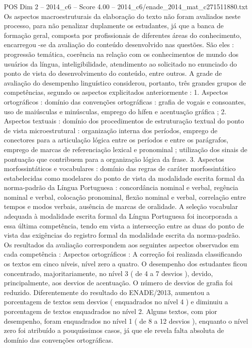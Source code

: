 \begin{textsample}{POS Dim 2 – 2014\_c6 – Score 4.00 – 2014\_c6/enade\_2014\_mat\_c271511880.txt}
Os aspectos macroestruturais da elaboração do texto não foram avaliados neste processo, para não penalizar duplamente os estudantes, já que a banca de formação geral, composta por profissionais de diferentes áreas do conhecimento, encarregou -se da avaliação do conteúdo desenvolvido nas questões.
São eles : progressão temática, coerência na relação com os conhecimentos de mundo dos usuários da língua, inteligibilidade, atendimento ao solicitado no enunciado do ponto de vista do desenvolvimento do conteúdo, entre outros.
A grade de avaliação do desempenho linguístico considerou, portanto, três grandes grupos de competências, segundo os aspectos explicitados anteriormente : 1.
Aspectos ortográficos : domínio das convenções ortográficas : grafia de vogais e consoantes, uso de maiúsculas e minúsculas, emprego do hífen e acentuação gráfica ; 2.
Aspectos textuais : domínio dos procedimentos de estruturação textual do ponto de vista microestrutural : organização interna dos períodos, emprego de conectores para a articulação lógica entre os períodos e entre os parágrafos, emprego de marcas de referenciação lexical e pronominal ; utilização dos sinais de pontuação que contribuem para a organização lógica da frase. 3.
Aspectos morfossintáticos e vocabulares : domínio das regras de caráter morfossintático estabelecidas como modelares do ponto de vista da modalidade escrita formal da norma-padrão da Língua Portuguesa : concordância nominal e verbal, regência nominal e verbal, colocação pronominal, flexão nominal e verbal, correlação entre tempos e modos verbais, ausência de marcas de oralidade.
A seleção vocabular adequada à modalidade escrita formal da Língua Portuguesa foi incorporada a essa última competência, tendo em vista a intersecção entre as duas do ponto de vista das exigências do registro formal da modalidade escrita da norma-padrão.
Os resultados da avaliação correspondem aos seguintes aspectos observados em cada competência : Aspectos ortográficos : A correção foi realizada classificando os textos em cinco níveis, nível zero a quatro.
O desempenho dos estudantes ficou concentrado, majoritariamente, no nível 3 ( de 4 a 7 desvios ), devido, principalmente, aos desvios de acentuação.
O número de desvios de grafia foi reduzido.
Diferentemente do resultado do ENADE/2013, aumentou a porcentagem de textos sem desvios ( enquadrados no nível 4 ) e diminuiu a porcentagem de textos enquadrados no nível 2.
Alguns textos, com pior desempenho, foram enquadrados no nível 1 ( de 8 a 12 desvios ), enquanto o nível zero foi atribuído a pouquíssimos casos, já que ele revela falta absoluta de domínio das convenções ortográficas.

\end{textsample}
